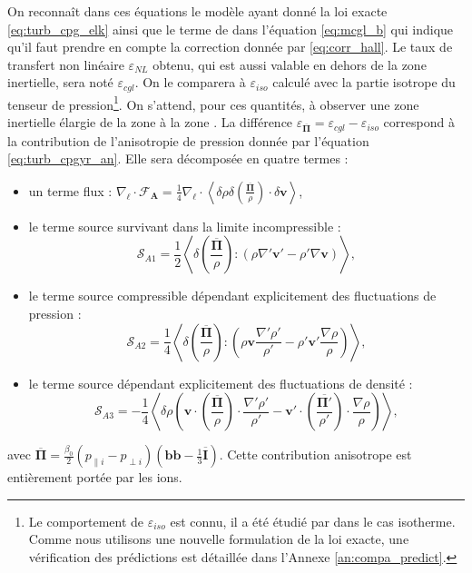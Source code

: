  On reconnaît dans ces équations le modèle ayant donné la loi exacte \eqref{eq:turb_cpg_elk} ainsi que le terme de  dans l'équation \eqref{eq:mcgl_b} qui indique qu'il faut prendre en compte la correction  donnée par \eqref{eq:corr_hall}. Le taux de transfert non linéaire $\varepsilon_{NL}$ obtenu, qui est aussi valable en dehors de la zone inertielle, sera noté $\varepsilon_{cgl}$. On le comparera à $\varepsilon_{iso}$ calculé avec la partie isotrope du tenseur de pression\footnote{Le comportement de $\varepsilon_{iso}$ est connu, il a été étudié par \cite{andres_energy_2018} dans le cas isotherme. Comme nous utilisons une nouvelle formulation de la loi exacte, une vérification des prédictions est détaillée dans l'Annexe \ref{an:compa_predict}.}. On s'attend, pour ces quantités, à observer une zone inertielle élargie de la zone  à la zone . 
 La différence $\varepsilon_{\overline{\boldsymbol{\Pi}}}=\varepsilon_{cgl}-\varepsilon_{iso}$ correspond à la contribution de l'anisotropie de pression donnée par l'équation \eqref{eq:turb_cpgyr_an}. Elle sera décomposée en quatre termes : 
 \begin{itemize}
     \item un terme flux : $\nabla_{\boldsymbol{\ell}} \cdot \boldsymbol{\mathcal{F}_A} = \frac{1}{4} \nabla_{\boldsymbol{\ell}} \cdot \left< \delta \rho \delta \left(\frac{\overline{\boldsymbol{\Pi}}}{\rho}\right) \cdot \delta \boldsymbol{v} \right> $,
     \item le terme source survivant dans la limite incompressible : 
     \begin{equation*}
         \mathcal{S}_{A1} = \frac{1}{2}\left<  \delta \left(\frac{\overline{\boldsymbol{\Pi}}}{\rho}\right) : \left(\rho\nabla' \boldsymbol{v'} -  \rho'\nabla  \boldsymbol{v}\right)\right>,
     \end{equation*}
     \item le terme source compressible dépendant explicitement des fluctuations de pression : 
     \begin{equation*}
         \mathcal{S}_{A2} =  \frac{1}{4}  \left<\delta \left(\frac{\overline{\boldsymbol{\Pi}}}{\rho}\right) : \left(\rho \boldsymbol{v} \frac{\nabla' \rho'}{\rho'} -\rho'\boldsymbol{v'}  \frac{\nabla \rho}{\rho} \right)  \right>,
     \end{equation*}
     \item le terme source dépendant explicitement des fluctuations de densité : 
     \begin{equation*}
         \mathcal{S}_{A3} = - \frac{1}{4}\left< \delta \rho \left(  \boldsymbol{v} \cdot   \left(\frac{\overline{\boldsymbol{\Pi}}}{\rho}\right) \cdot  \frac{\nabla' \rho'}{\rho'} - \boldsymbol{v'} \cdot \left(\frac{\overline{\boldsymbol{\Pi'}}}{\rho'}\right) \cdot  \frac{\nabla \rho}{\rho}\right) \right>,
     \end{equation*}
 \end{itemize}
 avec $\overline{\boldsymbol{\Pi}} =  \frac{\beta_0}{2} \left(p_{\parallel i } - p_{\perp i }\right)\left( \boldsymbol{b} \boldsymbol{b} - \frac{1}{3}  \overline{\boldsymbol{I}} \right)$. Cette contribution anisotrope est entièrement portée par les ions.
 
